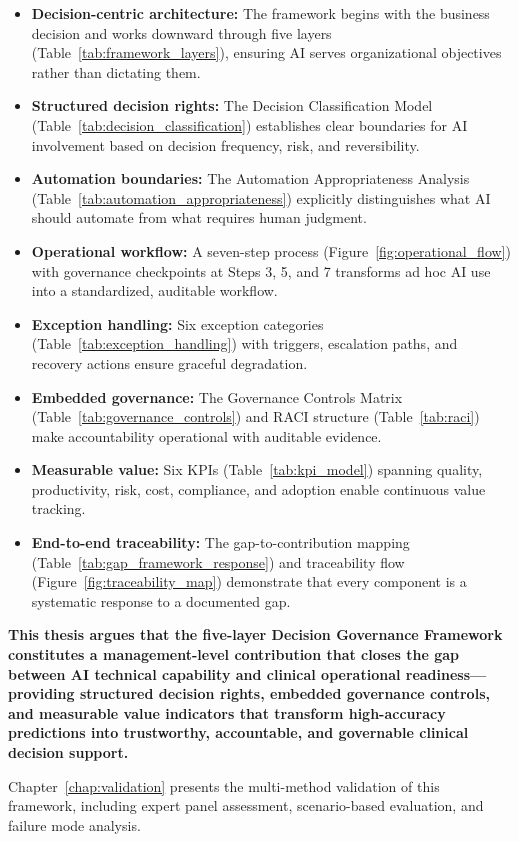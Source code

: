 \begin{itemize}
    \item \textbf{Decision-centric architecture:} The framework begins with the business decision and works downward through five layers (Table~\ref{tab:framework_layers}), ensuring AI serves organizational objectives rather than dictating them.

    \item \textbf{Structured decision rights:} The Decision Classification Model (Table~\ref{tab:decision_classification}) establishes clear boundaries for AI involvement based on decision frequency, risk, and reversibility.

    \item \textbf{Automation boundaries:} The Automation Appropriateness Analysis (Table~\ref{tab:automation_appropriateness}) explicitly distinguishes what AI should automate from what requires human judgment.

    \item \textbf{Operational workflow:} A seven-step process (Figure~\ref{fig:operational_flow}) with governance checkpoints at Steps 3, 5, and 7 transforms ad hoc AI use into a standardized, auditable workflow.

    \item \textbf{Exception handling:} Six exception categories (Table~\ref{tab:exception_handling}) with triggers, escalation paths, and recovery actions ensure graceful degradation.

    \item \textbf{Embedded governance:} The Governance Controls Matrix (Table~\ref{tab:governance_controls}) and RACI structure (Table~\ref{tab:raci}) make accountability operational with auditable evidence.

    \item \textbf{Measurable value:} Six KPIs (Table~\ref{tab:kpi_model}) spanning quality, productivity, risk, cost, compliance, and adoption enable continuous value tracking.

    \item \textbf{End-to-end traceability:} The gap-to-contribution mapping (Table~\ref{tab:gap_framework_response}) and traceability flow (Figure~\ref{fig:traceability_map}) demonstrate that every component is a systematic response to a documented gap.
\end{itemize}

\textbf{This thesis argues that the five-layer Decision Governance Framework constitutes a management-level contribution that closes the gap between AI technical capability and clinical operational readiness---providing structured decision rights, embedded governance controls, and measurable value indicators that transform high-accuracy predictions into trustworthy, accountable, and governable clinical decision support.}

Chapter~\ref{chap:validation} presents the multi-method validation of this framework, including expert panel assessment, scenario-based evaluation, and failure mode analysis.

